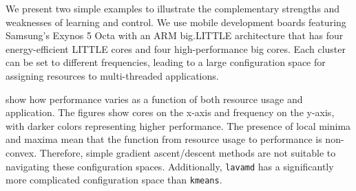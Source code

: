 \begin{figure}
 \label{fig:learning-models}
\end{figure}



We present two simple examples to illustrate the complementary
strengths and weaknesses of learning and control.  We use mobile
development boards featuring Samsung's Exynos 5 Octa with an ARM
big.LITTLE architecture that has four energy-efficient LITTLE cores
and four high-performance big cores.  Each cluster can be set to
different frequencies, leading to a large configuration space for
assigning resources to multi-threaded applications.

 show how performance
varies as a function of both resource usage and application.  The
figures show cores on the x-axis and frequency on the y-axis, with
darker colors representing higher performance.  The presence of local
minima and maxima mean that the function from resource usage to
performance is non-convex.  Therefore, simple gradient ascent/descent
methods are not suitable to navigating these configuration spaces.
Additionally, \texttt{lavamd} has a significantly more complicated
configuration space than \texttt{kmeans}.


